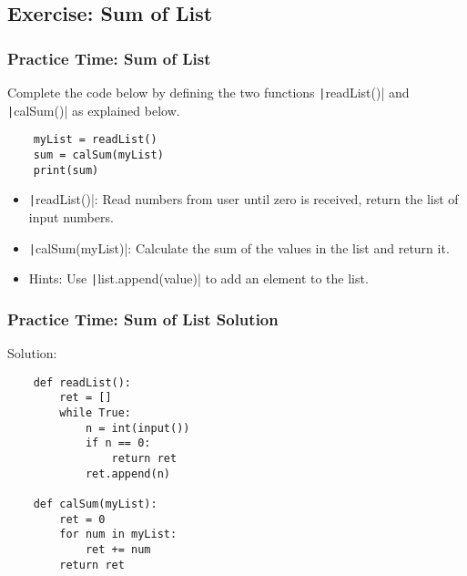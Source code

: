 \documentclass{beamer}
\newcommand{\python}[1]{\texttt|#1|}
\begin{document}
\subsection{Exercise: Sum of List}
\begin{frame}[fragile]
    \frametitle{Practice Time: Sum of List}
    Complete the code below by defining the two functions
    \python{readList()} and \python{calSum()} as explained below.

    \begin{verbatim}
    myList = readList()
    sum = calSum(myList)
    print(sum)
    \end{verbatim}

    \begin{itemize}
        \item \python{readList()}:
              Read numbers from user until zero is received,
              return the list of input numbers.
        \item \python{calSum(myList)}:
              Calculate the sum of the values in the list and return it.
        \item Hints: Use \python{list.append(value)} to add an element to the list.
    \end{itemize}

\end{frame}
\begin{frame}[fragile]
    \frametitle{Practice Time: Sum of List Solution}

    Solution:
    \begin{verbatim}
    def readList():
        ret = []
        while True:
            n = int(input())
            if n == 0:
                return ret
            ret.append(n)
    
    def calSum(myList):
        ret = 0
        for num in myList:
            ret += num
        return ret
    \end{verbatim}
\end{frame}
\end{document}
